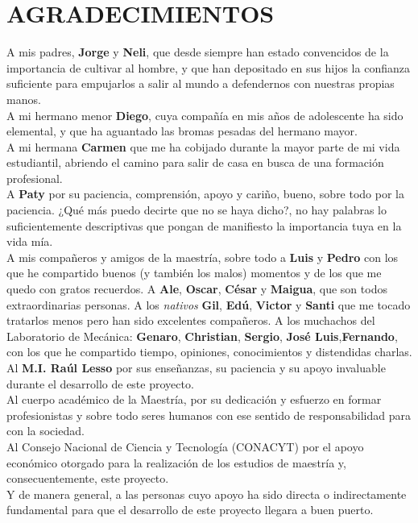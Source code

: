 \chapter*{AGRADECIMIENTOS}

\vspace{-10mm}

A mis padres, \textbf{Jorge} y \textbf{Neli}, que desde siempre han estado convencidos de la importancia de cultivar al hombre, y que 
han depositado en sus hijos la confianza suficiente para empujarlos a salir al mundo a 
defendernos con nuestras propias manos.\\

A mi hermano menor \textbf{Diego}, cuya compañía en mis años de adolescente ha sido elemental, y que ha 
aguantado las bromas pesadas del hermano mayor.\\

A mi hermana \textbf{Carmen} que me ha cobijado durante la mayor parte de mi vida estudiantil, 
abriendo el camino para salir de casa en busca de una formación profesional.\\

A \textbf{Paty} por su paciencia, comprensión, apoyo y cariño, bueno, sobre todo por la paciencia. ¿Qué más 
puedo decirte que no se haya dicho?, no hay palabras lo suficientemente descriptivas que pongan de manifiesto 
la importancia tuya en la vida mía. \\

A mis compañeros y amigos de la maestría, sobre todo a  \textbf{Luis} y \textbf{Pedro} con los que he compartido buenos (y también los malos) momentos y de los que me quedo con gratos recuerdos. A \textbf{Ale}, \textbf{Oscar}, \textbf{César} y \textbf{Maigua}, que son todos extraordinarias personas. A los \textit{nativos} \textbf{Gil}, \textbf{Edú}, \textbf{Victor} y \textbf{Santi} que me tocado tratarlos menos pero han sido excelentes compañeros. A los muchachos del Laboratorio de Mecánica: \textbf{Genaro}, \textbf{Christian}, \textbf{Sergio}, \textbf{José Luis},\textbf{Fernando}, con los que he compartido tiempo, opiniones, conocimientos y distendidas charlas.\\

Al \textbf{M.I. Raúl Lesso} por sus enseñanzas, su paciencia y su apoyo invaluable durante el desarrollo de este proyecto.\\

Al cuerpo académico de la Maestría, por su dedicación y esfuerzo en formar profesionistas y sobre todo 
seres humanos con ese sentido de responsabilidad para con la sociedad.\\

Al Consejo Nacional de Ciencia y Tecnología (CONACYT) por el apoyo económico otorgado para la realización de los estudios 
de maestría y, consecuentemente, este proyecto.\\

Y de manera general, a las personas cuyo apoyo ha sido directa o indirectamente fundamental para 
que el desarrollo de este proyecto llegara a buen puerto.
